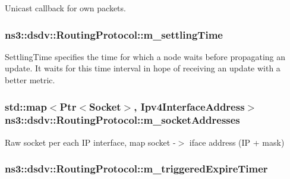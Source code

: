 Unicast callback for own packets. 

\subsubsection[{\texorpdfstring{m\+\_\+settling\+Time}{m_settlingTime}}]{ ns3\+::dsdv\+::\+Routing\+Protocol\+::m\+\_\+settling\+Time\hspace{0.3cm}{\ttfamily [private]}}\hypertarget{classns3_1_1dsdv_1_1RoutingProtocol_ac00a3214f64eddbab1fbf039aa293ae9}{}\label{classns3_1_1dsdv_1_1RoutingProtocol_ac00a3214f64eddbab1fbf039aa293ae9}
Settling\+Time specifies the time for which a node waits before propagating an update. It waits for this time interval in hope of receiving an update with a better metric. 
\subsubsection[{\texorpdfstring{m\+\_\+socket\+Addresses}{m_socketAddresses}}]{\setlength{\rightskip}{0pt plus 5cm}std\+::map$<${\bf Ptr}$<${\bf Socket}$>$, {\bf Ipv4\+Interface\+Address}$>$ ns3\+::dsdv\+::\+Routing\+Protocol\+::m\+\_\+socket\+Addresses\hspace{0.3cm}{\ttfamily [private]}}\hypertarget{classns3_1_1dsdv_1_1RoutingProtocol_a9f3be507604655079b145f063cf036fd}{}\label{classns3_1_1dsdv_1_1RoutingProtocol_a9f3be507604655079b145f063cf036fd}


Raw socket per each IP interface, map socket -\/$>$ iface address (IP + mask) 

\subsubsection[{\texorpdfstring{m\+\_\+triggered\+Expire\+Timer}{m_triggeredExpireTimer}}]{ ns3\+::dsdv\+::\+Routing\+Protocol\+::m\+\_\+triggered\+Expire\+Timer\hspace{0.3cm}{\ttfamily [private]}}\hypertarget{classns3_1_1dsdv_1_1RoutingProtocol_a013fc28f0c7cd0e5a001165ec6c7c899}{}\label{classns3_1_1dsdv_1_1RoutingProtocol_a013fc28f0c7cd0e5a001165ec6c7c899}


